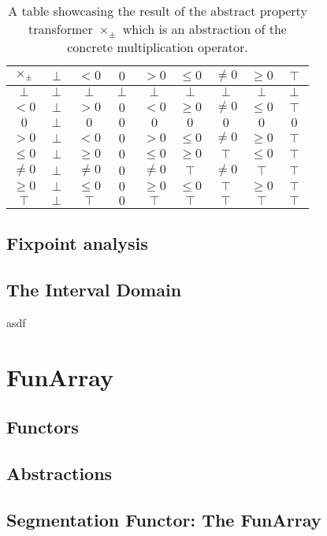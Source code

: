 \begin{table}[hbt]
\begin{center}
\begin{tabular}{c|c|c|c|c|c|c|c|c}
            $\times_\pm$& $\perp$ & $<0$    & $0$     & $>0$    & $\leq0$ & $\neq0$ & $\geq0$ & $\top$  \\ \hline
            $\perp$ & $\perp$ & $\perp$ & $\perp$ & $\perp$ & $\perp$ & $\perp$ & $\perp$ & $\perp$ \\
            $<0$    & $\perp$ & $>0$    & $0$     & $<0$    & $\geq0$ & $\neq0$ & $\leq0$ & $\top$  \\
            $0$     & $\perp$ & $0$     & $0$     & $0$     & $0$     & $0$     & $0$     & $0$     \\
            $>0$    & $\perp$ & $<0$    & $0$     & $>0$    & $\leq0$ & $\neq0$ & $\geq0$ & $\top$  \\
            $\leq0$ & $\perp$ & $\geq0$ & $0$     & $\leq0$ & $\geq0$ & $\top$  & $\leq0$ & $\top$  \\
            $\neq0$ & $\perp$ & $\neq0$ & $0$     & $\neq0$ & $\top$  & $\neq0$ & $\top$  & $\top$  \\
            $\geq0$ & $\perp$ & $\leq0$ & $0$     & $\geq0$ & $\leq0$ & $\top$  & $\geq0$ & $\top$  \\
            $\top$  & $\perp$ & $\top$  & $0$     & $\top$  & $\top$  & $\top$  & $\top$  & $\top$ 
        \end{tabular}
  \caption{A table showcasing the result of the abstract property transformer $\times_\pm$ which is an abstraction of the concrete multiplication operator.}\label{table:multiply}
  \end{center}
\end{table}

\subsection{Fixpoint analysis}

\subsection{The Interval Domain}
asdf



\section{FunArray}
\subsection{Functors}
\subsection{Abstractions}
\subsection{Segmentation Functor: The FunArray}
